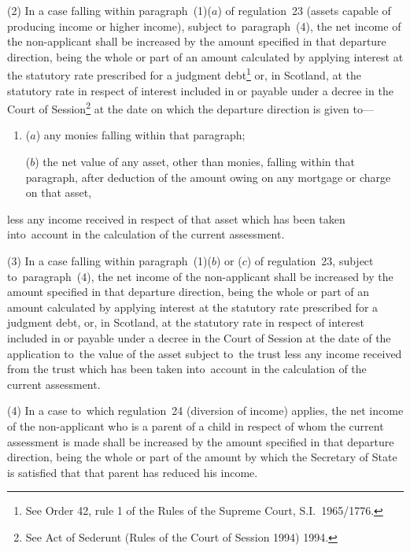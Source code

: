 \documentclass[12pt,a4paper]{article}
\begin{document}
(2) In a case falling within paragraph~(1)($a$) of regulation~23 (assets capable of producing income or higher income), subject to~paragraph~(4), the net income of the non-applicant shall be increased by 
the amount specified in that departure direction, being the whole or part of  %
an amount calculated by applying interest at the statutory rate prescribed for a judgment debt\footnote{\frenchspacing See Order 42, rule 1 of the Rules of the Supreme Court, S.I.~1965/1776.} or, in Scotland, at the statutory rate in respect of interest included in or payable under a decree in the Court of Session\footnote{\frenchspacing See Act of Sederunt (Rules of the Court of Session 1994) 1994.} at the date on which the departure direction is given to—
\begin{enumerate}\item[]
($a$) any monies falling within that paragraph;

($b$) the net value of any asset, other than monies, falling within that paragraph, after deduction of the amount owing on any mortgage or charge on that asset,
\end{enumerate}
less any income received in respect of that asset which has been taken into~account in the calculation of the current assessment.

(3) In a case falling within paragraph~(1)($b$) or ($c$) of regulation~23, subject to~paragraph~(4), the net income of the non-applicant shall be increased by 
the amount specified in that departure direction, being the whole or part of  %
an amount calculated by applying interest at the statutory rate prescribed for a judgment debt, or, in Scotland, at the statutory rate in respect of interest included in or payable under a decree in the Court of Session at the date of the application to~the value of the asset subject to~the trust less any income received from the trust which has been taken into~account in the calculation of the current assessment.

(4) In a case to~which regulation~24 (diversion of income) applies, the net income of the non-applicant who is a parent of a child in respect of whom the current assessment is made shall be increased by 
the amount specified in that departure direction, being the whole or part of  %
the amount by which the Secretary of State is satisfied that that parent has reduced his income.%
\end{document}
